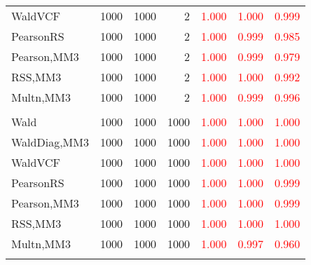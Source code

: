 \documentclass[
]{article}
\begin{document}
\begin{table}[H]
{\begin{tabular}[t]{lrrrrrr}
\hspace{1em}WaldVCF & 1000 & 1000 & 2 & \textcolor{red}{1.000} & \textcolor{red}{1.000} & \textcolor{red}{0.999}\\
\hspace{1em}PearsonRS & 1000 & 1000 & 2 & \textcolor{red}{1.000} & \textcolor{red}{0.999} & \textcolor{red}{0.985}\\
\hspace{1em}Pearson,MM3 & 1000 & 1000 & 2 & \textcolor{red}{1.000} & \textcolor{red}{0.999} & \textcolor{red}{0.979}\\
\hspace{1em}RSS,MM3 & 1000 & 1000 & 2 & \textcolor{red}{1.000} & \textcolor{red}{1.000} & \textcolor{red}{0.992}\\
\hspace{1em}Multn,MM3 & 1000 & 1000 & 2 & \textcolor{red}{1.000} & \textcolor{red}{0.999} & \textcolor{red}{0.996}\\
\addlinespace[0.3em]
\multicolumn{7}{l}{\textbf{1F 15V}}\\
\hspace{1em}Wald & 1000 & 1000 & 1000 & \textcolor{red}{1.000} & \textcolor{red}{1.000} & \vphantom{1} \textcolor{red}{1.000}\\
\hspace{1em}WaldDiag,MM3 & 1000 & 1000 & 1000 & \textcolor{red}{1.000} & \textcolor{red}{1.000} & \textcolor{red}{1.000}\\
\hspace{1em}WaldVCF & 1000 & 1000 & 1000 & \textcolor{red}{1.000} & \textcolor{red}{1.000} & \vphantom{1} \textcolor{red}{1.000}\\
\hspace{1em}PearsonRS & 1000 & 1000 & 1000 & \textcolor{red}{1.000} & \textcolor{red}{1.000} & \textcolor{red}{0.999}\\
\hspace{1em}Pearson,MM3 & 1000 & 1000 & 1000 & \textcolor{red}{1.000} & \textcolor{red}{1.000} & \textcolor{red}{0.999}\\
\hspace{1em}RSS,MM3 & 1000 & 1000 & 1000 & \textcolor{red}{1.000} & \textcolor{red}{1.000} & \textcolor{red}{1.000}\\
\hspace{1em}Multn,MM3 & 1000 & 1000 & 1000 & \textcolor{red}{1.000} & \textcolor{red}{0.997} & \textcolor{red}{0.960}\\
\addlinespace[0.3em]
\multicolumn{7}{l}{\textbf{2F 10V}}\\

\end{tabular}}
\end{table}
\end{document}
